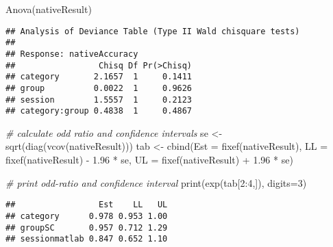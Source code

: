 \documentclass[
]{article}
\newenvironment{Shaded}{\begin{snugshade}}{\end{snugshade}}
\newcommand{\AttributeTok}[1]{\textcolor[rgb]{0.77,0.63,0.00}{#1}}
\newcommand{\CommentTok}[1]{\textcolor[rgb]{0.56,0.35,0.01}{\textit{#1}}}
\newcommand{\DecValTok}[1]{\textcolor[rgb]{0.00,0.00,0.81}{#1}}
\newcommand{\FloatTok}[1]{\textcolor[rgb]{0.00,0.00,0.81}{#1}}
\newcommand{\FunctionTok}[1]{\textcolor[rgb]{0.00,0.00,0.00}{#1}}
\newcommand{\NormalTok}[1]{#1}
\newcommand{\OtherTok}[1]{\textcolor[rgb]{0.56,0.35,0.01}{#1}}
\newcommand{\SpecialCharTok}[1]{\textcolor[rgb]{0.00,0.00,0.00}{#1}}
\newcommand{\StringTok}[1]{\textcolor[rgb]{0.31,0.60,0.02}{#1}}
\begin{document}
\begin{Shaded}
\begin{Highlighting}[]
\FunctionTok{Anova}\NormalTok{(nativeResult)}
\end{Highlighting}
\end{Shaded}

\begin{verbatim}
## Analysis of Deviance Table (Type II Wald chisquare tests)
## 
## Response: nativeAccuracy
##                 Chisq Df Pr(>Chisq)
## category       2.1657  1     0.1411
## group          0.0022  1     0.9626
## session        1.5557  1     0.2123
## category:group 0.4838  1     0.4867
\end{verbatim}

\begin{Shaded}
\begin{Highlighting}[]
\CommentTok{\# calculate odd ratio and confidence intervals}
\NormalTok{se }\OtherTok{\textless{}{-}} \FunctionTok{sqrt}\NormalTok{(}\FunctionTok{diag}\NormalTok{(}\FunctionTok{vcov}\NormalTok{(nativeResult)))}
\NormalTok{tab }\OtherTok{\textless{}{-}} \FunctionTok{cbind}\NormalTok{(}\AttributeTok{Est =} \FunctionTok{fixef}\NormalTok{(nativeResult),}
             \AttributeTok{LL =} \FunctionTok{fixef}\NormalTok{(nativeResult) }\SpecialCharTok{{-}} \FloatTok{1.96} \SpecialCharTok{*}\NormalTok{ se,}
             \AttributeTok{UL =} \FunctionTok{fixef}\NormalTok{(nativeResult) }\SpecialCharTok{+} \FloatTok{1.96} \SpecialCharTok{*}\NormalTok{ se)}

\CommentTok{\# print odd{-}ratio and confidence interval}
\FunctionTok{print}\NormalTok{(}\FunctionTok{exp}\NormalTok{(tab[}\DecValTok{2}\SpecialCharTok{:}\DecValTok{4}\NormalTok{,]), }\AttributeTok{digits=}\DecValTok{3}\NormalTok{)}
\end{Highlighting}
\end{Shaded}

\begin{verbatim}
##                 Est    LL   UL
## category      0.978 0.953 1.00
## groupSC       0.957 0.712 1.29
## sessionmatlab 0.847 0.652 1.10
\end{verbatim}

\begin{Shaded}
\end{Shaded}
\end{document}
